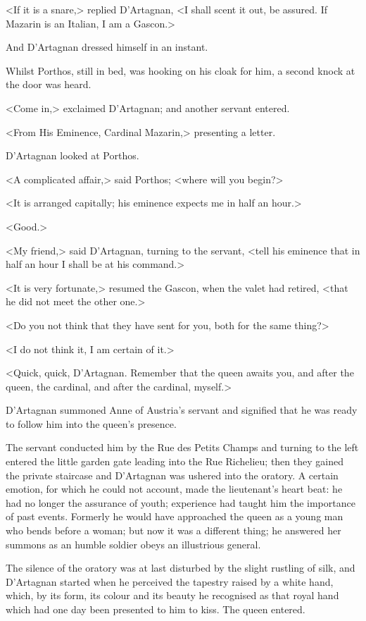 <If it is a snare,> replied D'Artagnan, <I shall scent it out, be assured. If Mazarin is an Italian, I am a Gascon.>

And D'Artagnan dressed himself in an instant.

Whilst Porthos, still in bed, was hooking on his cloak for him, a second knock at the door was heard.

<Come in,> exclaimed D'Artagnan; and another servant entered.

<From His Eminence, Cardinal Mazarin,> presenting a letter.

D'Artagnan looked at Porthos.

<A complicated affair,> said Porthos; <where will you begin?>

<It is arranged capitally; his eminence expects me in half an hour.>

<Good.>

<My friend,> said D'Artagnan, turning to the servant, <tell his eminence that in half an hour I shall be at his command.>

<It is very fortunate,> resumed the Gascon, when the valet had retired, <that he did not meet the other one.>

<Do you not think that they have sent for you, both for the same thing?>

<I do not think it, I am certain of it.>

<Quick, quick, D'Artagnan. Remember that the queen awaits you, and after the queen, the cardinal, and after the cardinal, myself.>

D'Artagnan summoned Anne of Austria's servant and signified that he was ready to follow him into the queen's presence.

The servant conducted him by the Rue des Petits Champs and turning to the left entered the little garden gate leading into the Rue Richelieu; then they gained the private staircase and D'Artagnan was ushered into the oratory. A certain emotion, for which he could not account, made the lieutenant's heart beat: he had no longer the assurance of youth; experience had taught him the importance of past events. Formerly he would have approached the queen as a young man who bends before a woman; but now it was a different thing; he answered her summons as an humble soldier obeys an illustrious general.

The silence of the oratory was at last disturbed by the slight rustling of silk, and D'Artagnan started when he perceived the tapestry raised by a white hand, which, by its form, its colour and its beauty he recognised as that royal hand which had one day been presented to him to kiss. The queen entered.

